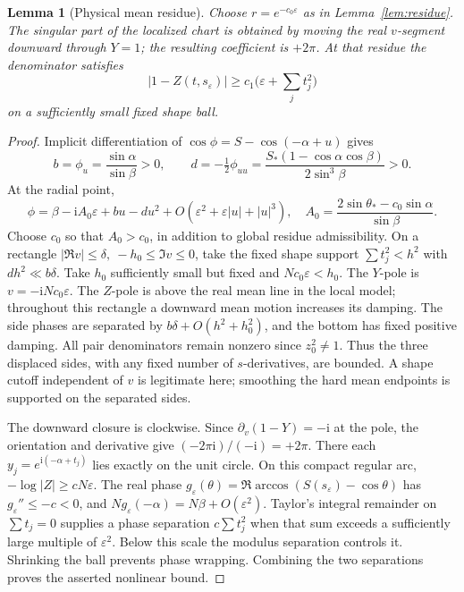 \documentclass[11pt]{article}
\numberwithin{equation}{section}
\newtheorem{lemma}[theorem]{Lemma}
\theoremstyle{definition}
\newcommand{\ii}{\mathrm i}
\newcommand{\eps}{\varepsilon}
\newcommand{\se}{s_\varepsilon}
\begin{document}
\begin{lemma}[Physical mean residue]\label{lem:mean}
Choose \(r=e^{-c_0\eps}\) as in Lemma~\ref{lem:residue}. The singular
part of the localized chart is obtained by moving the real \(v\)-segment
downward through \(Y=1\); the resulting coefficient is \(+2\pi\).
At that residue the denominator satisfies
\[
 |1-Z(t,\se)|\ge c_1\bigl(\eps+\textstyle\sum_jt_j^2\bigr)
\]
on a sufficiently small fixed shape ball.
\end{lemma}
\begin{proof}
Implicit differentiation of \(\cos\phi=S-\cos(-\alpha+u)\) gives
\[
 b=\phi_u=\frac{\sin\alpha}{\sin\beta}>0,\qquad
 d=-\tfrac12\phi_{uu}
   =\frac{S_*(1-\cos\alpha\cos\beta)}{2\sin^3\beta}>0.
\]
At the radial point,
\[
 \phi=\beta-\ii A_0\eps+bu-du^2
       +O(\eps^2+\eps|u|+|u|^3),\quad
 A_0=\frac{2\sin\theta_*-c_0\sin\alpha}{\sin\beta}.
\]
Choose \(c_0\) so that \(A_0>c_0\), in addition to global residue
admissibility. On a rectangle \(|\Re v|\le\delta,\ -h_0\le\Im v\le0\),
take the fixed shape support \(\sum t_j^2<h^2\) with \(dh^2\ll b\delta\).
Take \(h_0\) sufficiently small but fixed and \(Nc_0\eps<h_0\).
The \(Y\)-pole is \(v=-\ii Nc_0\eps\). The \(Z\)-pole is above the
real mean line in the local model; throughout this rectangle a downward
mean motion increases its damping. The side phases are separated by
\(b\delta+O(h^2+h_0^2)\), and the bottom has fixed positive damping.
All pair denominators remain nonzero since \(z_0^2\ne1\).
Thus the three displaced sides, with any fixed number of \(s\)-derivatives,
are bounded. A shape cutoff independent of \(v\) is legitimate here;
smoothing the hard mean endpoints is supported on the separated sides.

The downward closure is clockwise. Since
\(\partial_v(1-Y)=-\ii\) at the pole, the orientation and derivative
give \((-2\pi\ii)/(-\ii)=+2\pi\).
There each \(y_j=e^{\ii(-\alpha+t_j)}\) lies exactly on the unit circle.
On this compact regular arc, \(-\log|Z|\ge cN\eps\).
The real phase \(g_\eps(\theta)=\Re\arccos(S(\se)-\cos\theta)\) has
\(g_\eps''\le-c<0\), and
\(N g_\eps(-\alpha)=N\beta+O(\eps^2)\).
Taylor's integral remainder on \(\sum t_j=0\) supplies a phase
separation \(c\sum t_j^2\) when that sum exceeds a sufficiently large
multiple of \(\eps^2\). Below this scale the modulus separation
controls it. Shrinking the ball prevents phase wrapping. Combining
the two separations proves the asserted nonlinear bound.
\end{proof}
\end{document}
